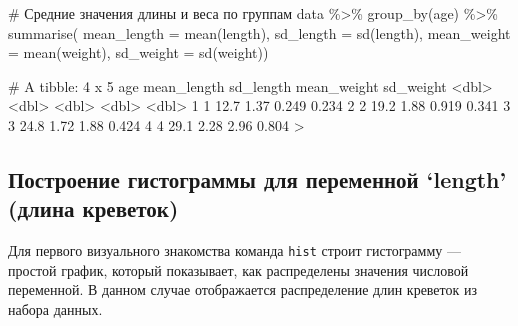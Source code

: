 \documentclass[
  letterpaper,
  DIV=11,
  numbers=noendperiod]{scrreprt}
\newenvironment{Shaded}{\begin{snugshade}}{\end{snugshade}}
\newcommand{\AttributeTok}[1]{\textcolor[rgb]{0.40,0.45,0.13}{#1}}
\newcommand{\CommentTok}[1]{\textcolor[rgb]{0.37,0.37,0.37}{#1}}
\newcommand{\DecValTok}[1]{\textcolor[rgb]{0.68,0.00,0.00}{#1}}
\newcommand{\ErrorTok}[1]{\textcolor[rgb]{0.68,0.00,0.00}{#1}}
\newcommand{\FloatTok}[1]{\textcolor[rgb]{0.68,0.00,0.00}{#1}}
\newcommand{\FunctionTok}[1]{\textcolor[rgb]{0.28,0.35,0.67}{#1}}
\newcommand{\NormalTok}[1]{\textcolor[rgb]{0.00,0.23,0.31}{#1}}
\newcommand{\SpecialCharTok}[1]{\textcolor[rgb]{0.37,0.37,0.37}{#1}}
\begin{document}
\begin{Shaded}
\begin{Highlighting}[]
\CommentTok{\# Средние значения длины и веса по группам}
\NormalTok{data }\SpecialCharTok{\%\textgreater{}\%}
   \FunctionTok{group\_by}\NormalTok{(age) }\SpecialCharTok{\%\textgreater{}\%}
   \FunctionTok{summarise}\NormalTok{(}
     \AttributeTok{mean\_length =} \FunctionTok{mean}\NormalTok{(length),}
     \AttributeTok{sd\_length =} \FunctionTok{sd}\NormalTok{(length),}
     \AttributeTok{mean\_weight =} \FunctionTok{mean}\NormalTok{(weight),}
     \AttributeTok{sd\_weight =} \FunctionTok{sd}\NormalTok{(weight))}
\end{Highlighting}
\end{Shaded}

\begin{Shaded}
\begin{Highlighting}[]
\CommentTok{\# A tibble: 4 x 5}
\NormalTok{    age mean\_length sd\_length mean\_weight sd\_weight}
  \SpecialCharTok{\textless{}}\NormalTok{dbl}\SpecialCharTok{\textgreater{}}       \ErrorTok{\textless{}}\NormalTok{dbl}\SpecialCharTok{\textgreater{}}     \ErrorTok{\textless{}}\NormalTok{dbl}\SpecialCharTok{\textgreater{}}       \ErrorTok{\textless{}}\NormalTok{dbl}\SpecialCharTok{\textgreater{}}     \ErrorTok{\textless{}}\NormalTok{dbl}\SpecialCharTok{\textgreater{}}
\DecValTok{1}     \DecValTok{1}        \FloatTok{12.7}      \FloatTok{1.37}       \FloatTok{0.249}     \FloatTok{0.234}
\DecValTok{2}     \DecValTok{2}        \FloatTok{19.2}      \FloatTok{1.88}       \FloatTok{0.919}     \FloatTok{0.341}
\DecValTok{3}     \DecValTok{3}        \FloatTok{24.8}      \FloatTok{1.72}       \FloatTok{1.88}      \FloatTok{0.424}
\DecValTok{4}     \DecValTok{4}        \FloatTok{29.1}      \FloatTok{2.28}       \FloatTok{2.96}      \FloatTok{0.804}
\SpecialCharTok{\textgreater{}} 
\end{Highlighting}
\end{Shaded}

\subsection{Построение гистограммы для переменной `length' (длина
креветок)}\label{ux43fux43eux441ux442ux440ux43eux435ux43dux438ux435-ux433ux438ux441ux442ux43eux433ux440ux430ux43cux43cux44b-ux434ux43bux44f-ux43fux435ux440ux435ux43cux435ux43dux43dux43eux439-length-ux434ux43bux438ux43dux430-ux43aux440ux435ux432ux435ux442ux43eux43a}

Для первого визуального знакомства команда \texttt{hist} строит
гистограмму --- простой график, который показывает, как распределены
значения числовой переменной. В данном случае отображается распределение
длин креветок из набора данных.
\end{document}
